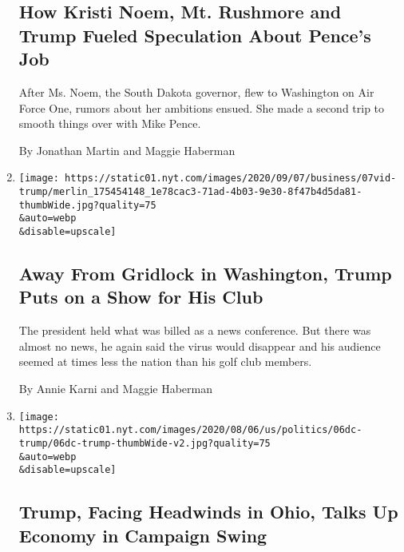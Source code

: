 \begin{enumerate}
  \hypertarget{how-kristi-noem-mt-rushmore-and-trump-fueled-speculation-about-pences-job}{%
  \subsection{How Kristi Noem, Mt. Rushmore and Trump Fueled Speculation
  About Pence's
  Job}\label{how-kristi-noem-mt-rushmore-and-trump-fueled-speculation-about-pences-job}}

  After Ms. Noem, the South Dakota governor, flew to Washington on Air
  Force One, rumors about her ambitions ensued. She made a second trip
  to smooth things over with Mike Pence.

  By Jonathan Martin and Maggie Haberman
\item
  \href{/2020/08/07/us/politics/trump-news-conference-bedminster.html}{}

  \texttt{[image: https://static01.nyt.com/images/2020/09/07/business/07vid-trump/merlin\_175454148\_1e78cac3-71ad-4b03-9e30-8f47b4d5da81-thumbWide.jpg?quality=75\\\&auto=webp\\\&disable=upscale]}

  \hypertarget{away-from-gridlock-in-washington-trump-puts-on-a-show-for-his-club}{%
  \subsection{Away From Gridlock in Washington, Trump Puts on a Show for
  His
  Club}\label{away-from-gridlock-in-washington-trump-puts-on-a-show-for-his-club}}

  The president held what was billed as a news conference. But there was
  almost no news, he again said the virus would disappear and his
  audience seemed at times less the nation than his golf club members.

  By Annie Karni and Maggie Haberman
\item
  \href{/2020/08/06/us/politics/trump-economy-ohio.html}{}

  \texttt{[image: https://static01.nyt.com/images/2020/08/06/us/politics/06dc-trump/06dc-trump-thumbWide-v2.jpg?quality=75\\\&auto=webp\\\&disable=upscale]}

  \hypertarget{trump-facing-headwinds-in-ohio-talks-up-economy-in-campaign-swing}{%
  \subsection{Trump, Facing Headwinds in Ohio, Talks Up Economy in
  Campaign
  Swing}\label{trump-facing-headwinds-in-ohio-talks-up-economy-in-campaign-swing}}


\end{enumerate}
